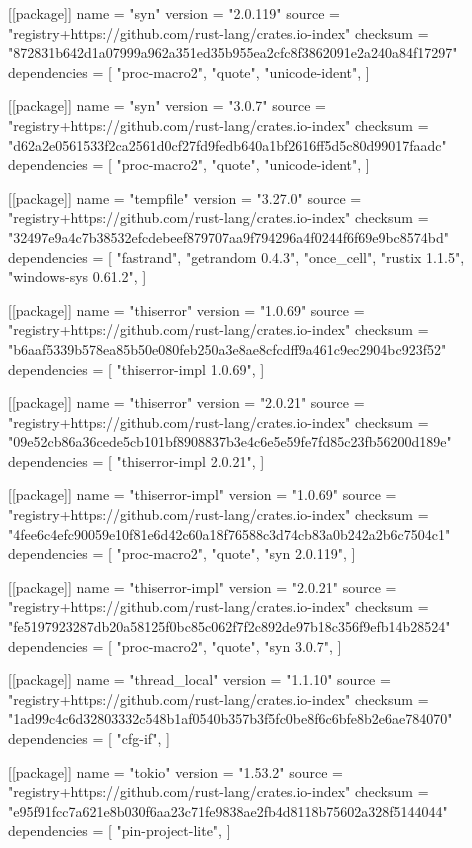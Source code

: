 [[package]]
name = "syn"
version = "2.0.119"
source = "registry+https://github.com/rust-lang/crates.io-index"
checksum = "872831b642d1a07999a962a351ed35b955ea2cfc8f3862091e2a240a84f17297"
dependencies = [
 "proc-macro2",
 "quote",
 "unicode-ident",
]

[[package]]
name = "syn"
version = "3.0.7"
source = "registry+https://github.com/rust-lang/crates.io-index"
checksum = "d62a2e0561533f2ca2561d0cf27fd9fedb640a1bf2616ff5d5c80d99017faadc"
dependencies = [
 "proc-macro2",
 "quote",
 "unicode-ident",
]

[[package]]
name = "tempfile"
version = "3.27.0"
source = "registry+https://github.com/rust-lang/crates.io-index"
checksum = "32497e9a4c7b38532efcdebeef879707aa9f794296a4f0244f6f69e9bc8574bd"
dependencies = [
 "fastrand",
 "getrandom 0.4.3",
 "once_cell",
 "rustix 1.1.5",
 "windows-sys 0.61.2",
]

[[package]]
name = "thiserror"
version = "1.0.69"
source = "registry+https://github.com/rust-lang/crates.io-index"
checksum = "b6aaf5339b578ea85b50e080feb250a3e8ae8cfcdff9a461c9ec2904bc923f52"
dependencies = [
 "thiserror-impl 1.0.69",
]

[[package]]
name = "thiserror"
version = "2.0.21"
source = "registry+https://github.com/rust-lang/crates.io-index"
checksum = "09e52cb86a36cede5cb101bf8908837b3e4c6e5e59fe7fd85c23fb56200d189e"
dependencies = [
 "thiserror-impl 2.0.21",
]

[[package]]
name = "thiserror-impl"
version = "1.0.69"
source = "registry+https://github.com/rust-lang/crates.io-index"
checksum = "4fee6c4efc90059e10f81e6d42c60a18f76588c3d74cb83a0b242a2b6c7504c1"
dependencies = [
 "proc-macro2",
 "quote",
 "syn 2.0.119",
]

[[package]]
name = "thiserror-impl"
version = "2.0.21"
source = "registry+https://github.com/rust-lang/crates.io-index"
checksum = "fe5197923287db20a58125f0bc85c062f7f2c892de97b18c356f9efb14b28524"
dependencies = [
 "proc-macro2",
 "quote",
 "syn 3.0.7",
]

[[package]]
name = "thread_local"
version = "1.1.10"
source = "registry+https://github.com/rust-lang/crates.io-index"
checksum = "1ad99c4c6d32803332c548b1af0540b357b3f5fc0be8f6c6bfe8b2e6ae784070"
dependencies = [
 "cfg-if",
]

[[package]]
name = "tokio"
version = "1.53.2"
source = "registry+https://github.com/rust-lang/crates.io-index"
checksum = "e95f91fcc7a621e8b030f6aa23c71fe9838ae2fb4d8118b75602a328f5144044"
dependencies = [
 "pin-project-lite",
]

